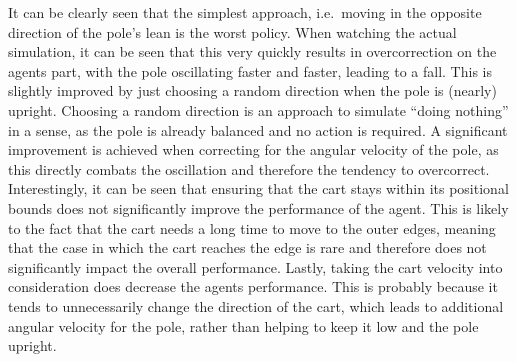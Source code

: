 \documentclass[11pt]{article}
\makeatletter
\newcommand{\boxspacing}{\kern\kvtcb@left@rule\kern\kvtcb@boxsep}
\newcommand{\prompt}[4]{
        {\ttfamily\llap{{\color{#2}[#3]:\hspace{3pt}#4}}\vspace{-\baselineskip}}
    }
\makeatother
\begin{document}
    It can be clearly seen that the simplest approach, i.e.~moving in the
opposite direction of the pole's lean is the worst policy. When watching
the actual simulation, it can be seen that this very quickly results in
overcorrection on the agents part, with the pole oscillating faster and
faster, leading to a fall. This is slightly improved by just choosing a
random direction when the pole is (nearly) upright. Choosing a random
direction is an approach to simulate ``doing nothing'' in a sense, as
the pole is already balanced and no action is required. A significant
improvement is achieved when correcting for the angular velocity of the
pole, as this directly combats the oscillation and therefore the
tendency to overcorrect. Interestingly, it can be seen that ensuring
that the cart stays within its positional bounds does not significantly
improve the performance of the agent. This is likely to the fact that
the cart needs a long time to move to the outer edges, meaning that the
case in which the cart reaches the edge is rare and therefore does not
significantly impact the overall performance. Lastly, taking the cart
velocity into consideration does decrease the agents performance. This
is probably because it tends to unnecessarily change the direction of
the cart, which leads to additional angular velocity for the pole,
rather than helping to keep it low and the pole upright.

    \begin{tcolorbox}[breakable, size=fbox, boxrule=1pt, pad at break*=1mm,colback=cellbackground, colframe=cellborder]
\prompt{In}{incolor}{ }{\boxspacing}
\begin{Verbatim}[commandchars=\\\{\}]

\end{Verbatim}
\end{tcolorbox}


    
    
    
\end{document}
